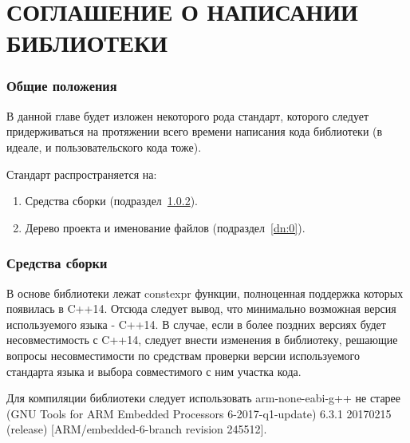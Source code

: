 \chapter{СОГЛАШЕНИЕ О НАПИСАНИИ БИБЛИОТЕКИ}
\subsection{Общие положения}
В данной главе будет изложен некоторого рода стандарт, которого следует придерживаться на протяжении всего времени написания кода библиотеки (в идеале, и пользовательского кода тоже).

Стандарт распространяется на:
\begin{enumerate}
	\item Средства сборки (подраздел~\ref{compgcc:0}).
	\item Дерево проекта и именование файлов (подраздел~\ref{dn:0}).
\end{enumerate}

\subsection{Средства сборки}
\label{compgcc:0}
В основе библиотеки лежат constexpr функции, полноценная поддержка которых появилась в C++14. Отсюда следует вывод, что минимально возможная версия используемого языка - C++14. В случае, если в более поздних версиях будет несовместимость с C++14, следует внести изменения в библиотеку, решающие вопросы несовместимости по средствам проверки версии используемого стандарта языка и выбора совместимого с ним участка кода.

Для компиляции библиотеки следует использовать arm-none-eabi-g++ не старее (GNU Tools for ARM Embedded Processors 6-2017-q1-update) 6.3.1 20170215 (release) [ARM/embedded-6-branch revision 245512].

